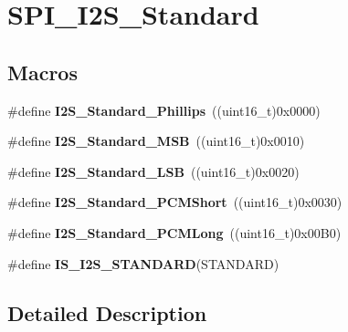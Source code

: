 \hypertarget{group___s_p_i___i2_s___standard}{}\section{S\+P\+I\+\_\+\+I2\+S\+\_\+\+Standard}
\label{group___s_p_i___i2_s___standard}
\subsection*{Macros}
\begin{DoxyCompactItemize}
\item 
\hypertarget{group___s_p_i___i2_s___standard_gacdb89d66a2a941924ff4b7a8d14884f9}{}\#define {\bfseries I2\+S\+\_\+\+Standard\+\_\+\+Phillips}~((uint16\+\_\+t)0x0000)\label{group___s_p_i___i2_s___standard_gacdb89d66a2a941924ff4b7a8d14884f9}

\item 
\hypertarget{group___s_p_i___i2_s___standard_gae716cfa7e031affc37fe65dd80b0e6f4}{}\#define {\bfseries I2\+S\+\_\+\+Standard\+\_\+\+M\+S\+B}~((uint16\+\_\+t)0x0010)\label{group___s_p_i___i2_s___standard_gae716cfa7e031affc37fe65dd80b0e6f4}

\item 
\hypertarget{group___s_p_i___i2_s___standard_ga88bc9001a13b95a0844d81fea2080df6}{}\#define {\bfseries I2\+S\+\_\+\+Standard\+\_\+\+L\+S\+B}~((uint16\+\_\+t)0x0020)\label{group___s_p_i___i2_s___standard_ga88bc9001a13b95a0844d81fea2080df6}

\item 
\hypertarget{group___s_p_i___i2_s___standard_gaaf59e587048ff632037dfc9875ab4c7b}{}\#define {\bfseries I2\+S\+\_\+\+Standard\+\_\+\+P\+C\+M\+Short}~((uint16\+\_\+t)0x0030)\label{group___s_p_i___i2_s___standard_gaaf59e587048ff632037dfc9875ab4c7b}

\item 
\hypertarget{group___s_p_i___i2_s___standard_gaf79cb88702059506d876dbd776d7a136}{}\#define {\bfseries I2\+S\+\_\+\+Standard\+\_\+\+P\+C\+M\+Long}~((uint16\+\_\+t)0x00\+B0)\label{group___s_p_i___i2_s___standard_gaf79cb88702059506d876dbd776d7a136}

\item 
\#define {\bfseries I\+S\+\_\+\+I2\+S\+\_\+\+S\+T\+A\+N\+D\+A\+R\+D}(S\+T\+A\+N\+D\+A\+R\+D)
\end{DoxyCompactItemize}


\subsection{Detailed Description}


